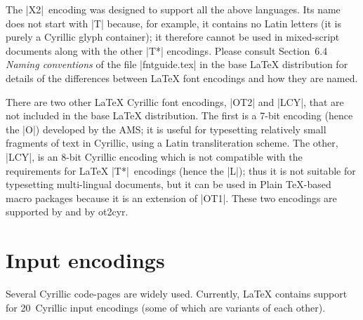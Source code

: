 \documentclass{ltxguide}[1999/02/28]
\begin{document}
The |X2|~encoding was designed to support all the above languages.
Its name does not start with |T| because, for example, it contains no
Latin letters (it is purely a Cyrillic glyph container); it therefore
cannot be used in mixed-script documents along with the other |T*|
encodings.  Please consult Section~6.4 \textit{Naming conventions} of
the file |fntguide.tex| in the base \LaTeX{} distribution for details
of the differences between \LaTeX{} font encodings and how they are
named.

There are two other \LaTeX{} Cyrillic font encodings, |OT2| and |LCY|,
that are not included in the base \LaTeX{} distribution.  The first is
a \mbox{7-bit} encoding (hence the |O|) developed by the AMS; it is
useful for typesetting relatively small fragments of text in Cyrillic,
using a Latin transliteration scheme.  The other, |LCY|, is an
\mbox{8-bit} Cyrillic encoding which is not compatible with the
requirements for \LaTeX{} |T*|~encodings (hence the |L|); thus it is not
suitable for typesetting multi-lingual documents, but it can be used in
Plain \TeX{}-based macro packages because it is an extension of |OT1|.
These two encodings are supported by \babel{} and by \textsf{ot2cyr}.


\section{Input encodings}
\label{inputencs}

Several Cyrillic code-pages are widely used.  Currently, \LaTeX{}
contains support for 20~Cyrillic input encodings (some of which are
variants of each other).
\end{document}
